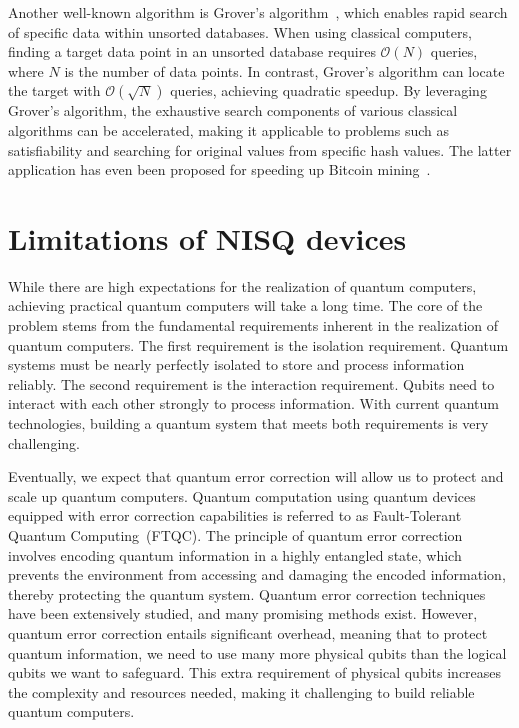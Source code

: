 \documentclass[12pt,dvipdfmx,twoside,openright]{report}
\begin{document}
Another well-known algorithm is Grover's algorithm~\cite{grover1996fast}, which enables rapid search of specific data within unsorted databases.
When using classical computers, finding a target data point in an unsorted database requires $\mathcal{O}(N)$ queries, where $N$ is the number of data points.
In contrast, Grover's algorithm can locate the target with $\mathcal{O}(\sqrt{N})$ queries, achieving quadratic speedup.
By leveraging Grover's algorithm, the exhaustive search components of various classical algorithms can be accelerated, making it applicable to problems such as satisfiability and searching for original values from specific hash values.
The latter application has even been proposed for speeding up Bitcoin mining~\cite{bitcoin}.




\section{Limitations of NISQ devices}
While there are high expectations for the realization of quantum computers, achieving practical quantum computers will take a long time.
The core of the problem stems from the fundamental requirements inherent in the realization of quantum computers.
The first requirement is the isolation requirement.
Quantum systems must be nearly perfectly isolated to store and process information reliably.
The second requirement is the interaction requirement.
Qubits need to interact with each other strongly to process information.
With current quantum technologies, building a quantum system that meets both requirements is very challenging.

Eventually, we expect that quantum error correction will allow us to protect and scale up quantum computers.
Quantum computation using quantum devices equipped with error correction capabilities is referred to as Fault-Tolerant Quantum Computing~(FTQC).
The principle of quantum error correction involves encoding quantum information in a highly entangled state, which prevents the environment from accessing and damaging the encoded information, thereby protecting the quantum system.
Quantum error correction techniques have been extensively studied, and many promising methods exist.
However, quantum error correction entails significant overhead, meaning that to protect quantum information, we need to use many more physical qubits than the logical qubits we want to safeguard.
This extra requirement of physical qubits increases the complexity and resources needed, making it challenging to build reliable quantum computers.
\end{document}

